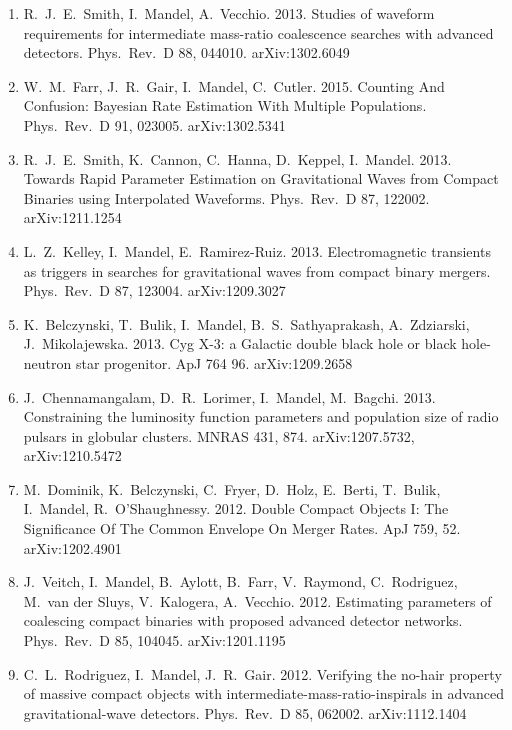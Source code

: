 \documentclass[margin,line]{res}
\begin{document}
\begin{resume}
\begin{enumerate}
\item  R.~J.~E.~Smith, I.~Mandel, A.~Vecchio. 2013.  Studies of waveform requirements for intermediate mass-ratio coalescence searches with advanced detectors. Phys.~Rev.~D 88, 044010.  arXiv:1302.6049

\item  W.~M.~Farr, J.~R.~Gair, I.~Mandel, C.~Cutler.  2015.  Counting And Confusion: Bayesian Rate Estimation With Multiple Populations.  Phys.~Rev.~D 91, 023005. arXiv:1302.5341

\item  R.~J.~E.~Smith, K.~Cannon, C.~Hanna, D.~Keppel, I.~Mandel. 2013. Towards Rapid Parameter Estimation on Gravitational Waves from Compact Binaries using Interpolated Waveforms.  Phys.~Rev.~D 87, 122002.  arXiv:1211.1254

\item  L.~Z.~Kelley, I.~Mandel, E.~Ramirez-Ruiz. 2013.  Electromagnetic transients as triggers in searches for gravitational waves from compact binary mergers. Phys.~Rev.~D 87, 123004.  arXiv:1209.3027

\item  K.~Belczynski, T.~Bulik, I.~Mandel, B.~S.~Sathyaprakash, A.~Zdziarski, J.~Mikolajewska. 2013. Cyg X-3: a Galactic double black hole or black hole-neutron star progenitor. ApJ 764 96. arXiv:1209.2658

\item  J.~Chennamangalam, D.~R.~Lorimer, I.~Mandel, M.~Bagchi.  2013. Constraining the luminosity function parameters and population size of radio pulsars in globular clusters.  MNRAS 431, 874.  arXiv:1207.5732, arXiv:1210.5472

\item  M.~Dominik, K.~Belczynski, C.~Fryer, D.~Holz, E.~Berti, T.~Bulik, I.~Mandel, R.~O'Shaughnessy.  2012.  Double Compact Objects I: The Significance Of The Common Envelope On Merger Rates.  ApJ 759, 52.  arXiv:1202.4901

\item  J.~Veitch, I.~Mandel, B.~Aylott, B.~Farr, V.~Raymond, C.~Rodriguez, M.~van der Sluys, V.~Kalogera, A.~Vecchio.  2012.  Estimating parameters of coalescing compact binaries with proposed advanced detector networks. Phys.~Rev.~D 85, 104045. arXiv:1201.1195

\item  C.~L.~Rodriguez, I.~Mandel, J.~R.~Gair.  2012. Verifying the no-hair property of massive compact objects with intermediate-mass-ratio-inspirals in advanced gravitational-wave detectors. Phys.~Rev.~D 85, 062002. arXiv:1112.1404


\end{enumerate}
\end{resume}
\end{document}
